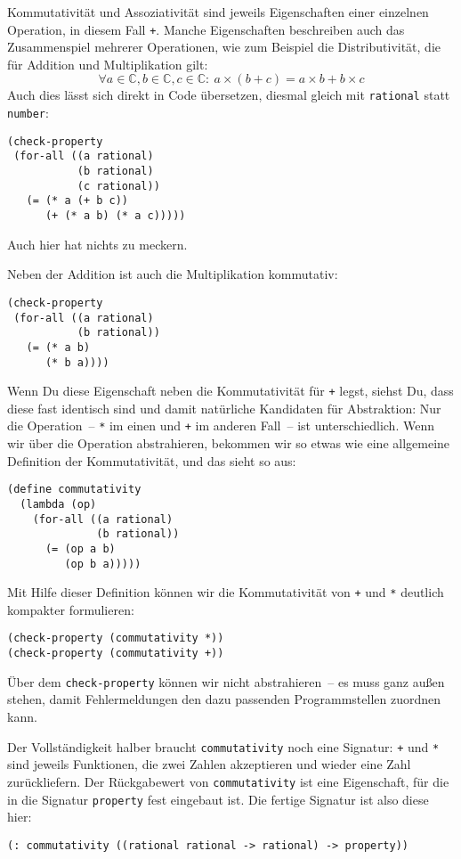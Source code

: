Kommutativität und Assoziativität sind jeweils Eigenschaften einer
einzelnen Operation, in diesem Fall \lstinline{+}.  Manche Eigenschaften
beschreiben auch das Zusammenspiel mehrerer Operationen, wie zum
Beispiel die Distributivität, die für Addition und Multiplikation
gilt:
%
\begin{displaymath}
\forall a \in \mathbb{C}, b \in \mathbb{C}, c \in \mathbb{C}:\
a\times(b+c) = a\times b + b\times c
\end{displaymath}
%
Auch dies lässt sich direkt in Code übersetzen, diesmal gleich mit
\lstinline{rational} statt \lstinline{number}:
%
\begin{lstlisting}
(check-property
 (for-all ((a rational)
           (b rational)
           (c rational))
   (= (* a (+ b c))
      (+ (* a b) (* a c)))))
\end{lstlisting}
%
Auch hier hat \drscheme{} nichts zu meckern.

Neben der Addition ist auch die Multiplikation kommutativ:
%
\begin{lstlisting}
(check-property
 (for-all ((a rational)
           (b rational))
   (= (* a b)
      (* b a))))
\end{lstlisting}
%
Wenn Du diese Eigenschaft neben die Kommutativität für \lstinline{+}
legst, siehst Du, dass diese fast identisch sind und damit natürliche
Kandidaten für Abstraktion: Nur die Operation~-- \lstinline{*} im einen
und \lstinline{+} im anderen Fall~-- ist unterschiedlich.  Wenn wir über
die Operation abstrahieren, bekommen wir so etwas wie eine allgemeine
Definition der Kommutativität, und das sieht so aus:

\begin{lstlisting}
(define commutativity
  (lambda (op)
    (for-all ((a rational)
              (b rational))
      (= (op a b)
         (op b a)))))
\end{lstlisting}
%
Mit Hilfe dieser Definition können wir die Kommutativität von
\lstinline{+} und \lstinline{*} deutlich kompakter formulieren:
%
\begin{lstlisting}
(check-property (commutativity *))
(check-property (commutativity +))
\end{lstlisting}
%
Über dem \lstinline{check-property} können wir nicht abstrahieren~-- es
muss ganz außen stehen, damit \drscheme{} Fehlermeldungen den dazu
passenden Programmstellen zuordnen kann.

Der Vollständigkeit halber braucht \lstinline{commutativity} noch eine
Signatur: \lstinline{+} und \lstinline{*} sind jeweils Funktionen, die zwei
Zahlen akzeptieren und wieder eine Zahl zurückliefern.  Der
Rückgabewert von \lstinline{commutativity} ist eine Eigenschaft, für die
in \drscheme{} die Signatur \lstinline{property} fest eingebaut ist.  Die
fertige Signatur ist also diese hier:
%
\begin{lstlisting}
(: commutativity ((rational rational -> rational) -> property))
\end{lstlisting}

